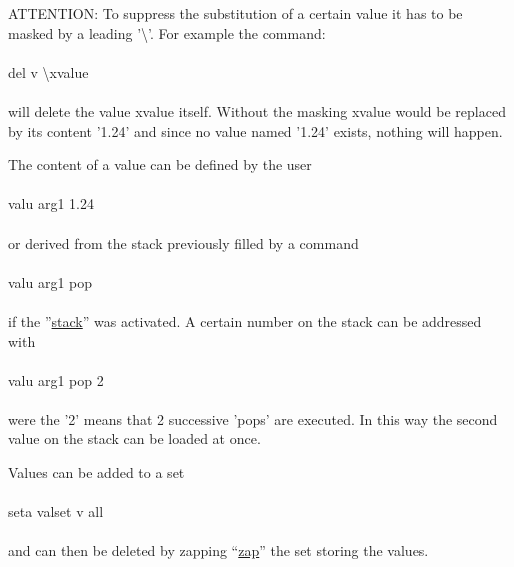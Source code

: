 \documentclass{article}
\providecommand{\htmlref}[2]{\hyperref[#2]{#1}}
\begin{document}
ATTENTION: To suppress the substitution of a certain value it has to be masked by a leading '\textbackslash{}'. For example the command:\\\\del v \textbackslash{}xvalue\\\\will delete the value xvalue itself. Without the masking xvalue would be replaced by its content '1.24' and since no value named '1.24' exists, nothing will happen.

The content of a value can be defined by the user\\\\valu arg1 1.24\\\\or derived from the stack previously filled by a command\\\\valu arg1 pop\\\\if the ''\htmlref{stack}{stack}'' was activated. A certain number on the stack can be addressed with\\\\valu arg1 pop 2\\\\were the '2' means that 2 successive 'pops' are executed. In this way the second value on the stack can be loaded at once.

Values can be added to a set\\\\ seta valset v all\\\\and can then be deleted by zapping ``\htmlref{zap}{zap}'' the set storing the values.
\end{document}
